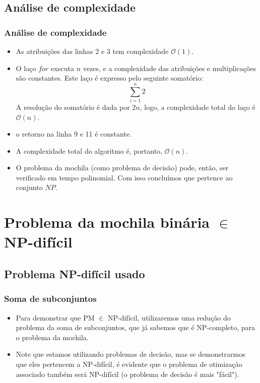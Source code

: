 \documentclass{beamer}
\begin{document}
\subsection{Análise de complexidade}
\begin{frame}
    \frametitle{Análise de complexidade}

    \begin{itemize}
        \item As atribuições das linhas 2 e 3 tem complexidade $\mathcal{O}(1)$.

        \item O laço $for$ executa $n$ vezes, e a complexidade das atribuições e multiplicações são constantes. Este laço é expresso pelo seguinte somatório:
        \begin{equation*}
            \sum_{i=1}^{n} 2
         \end{equation*}
        A resolução do somatório é dada por $2n$, logo, a complexidade total do laço é $\mathcal{O}(n)$.
        \item o retorno na linha 9 e 11 é constante.
        \item A complexidade total do algoritmo é, portanto, $\mathcal{O}(n)$.
        \item O problema da mochila (como problema de decisão) pode, então, ser verificado em tempo polinomial.
              Com isso concluímos que pertence ao conjunto $NP$.
    \end{itemize}

\end{frame}


\section{Problema da mochila binária $\in$ NP-difícil}

\subsection{Problema NP-difícil usado}
\begin{frame}
    \frametitle{Soma de subconjuntos}
    \begin{itemize}
        \item
            Para demonstrar que PM $\in$ NP-difícil, utilizaremos uma redução do problema
            da soma de subconjuntos, que já sabemos que é NP-completo, para o problema da mochila.
        \item
            Note que estamos utilizando problemas de decisão, mas se demonstrarmos que
            eles pertencem a NP-difícil, é evidente que o problema de otimização associado
            também será NP-difícil (o problema de decisão é mais "fácil").
    \end{itemize}

\end{frame}
\end{document}
